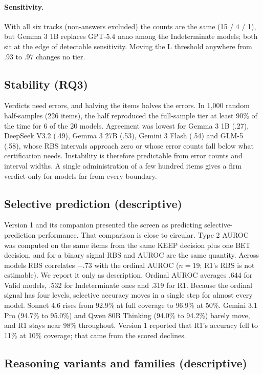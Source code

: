 \documentclass[11pt,a4paper]{article}
\begin{document}
\paragraph{Sensitivity.} With all six tracks (non-answers excluded) the counts are the same (15 / 4 / 1), but Gemma 3 1B replaces GPT-5.4 nano among the Indeterminate models; both sit at the edge of detectable sensitivity. Moving the L threshold anywhere from .93 to .97 changes no tier.

\subsection{Stability (RQ3)}

Verdicts need errors, and halving the items halves the errors. In 1,000 random half-samples (226 items), the half reproduced the full-sample tier at least 90\% of the time for 6 of the 20 models. Agreement was lowest for Gemma 3 1B (.27), DeepSeek V3.2 (.49), Gemma 3 27B (.53), Gemini 3 Flash (.54) and GLM-5 (.58), whose RBS intervals approach zero or whose error counts fall below what certification needs. Instability is therefore predictable from error counts and interval widths. A single administration of a few hundred items gives a firm verdict only for models far from every boundary.

\subsection{Selective prediction (descriptive)}

Version 1 and its companion presented the screen as predicting selective-prediction performance. That comparison is close to circular. Type 2 AUROC was computed on the same items from the same KEEP decision plus one BET decision, and for a binary signal RBS and AUROC are the same quantity. Across models RBS correlates $-.73$ with the ordinal AUROC ($n = 19$; R1's RBS is not estimable). We report it only as description. Ordinal AUROC averages .644 for Valid models, .532 for Indeterminate ones and .319 for R1. Because the ordinal signal has four levels, selective accuracy moves in a single step for almost every model. Sonnet 4.6 rises from 92.9\% at full coverage to 96.9\% at 50\%. Gemini 3.1 Pro (94.7\% to 95.0\%) and Qwen 80B Thinking (94.0\% to 94.2\%) barely move, and R1 stays near 98\% throughout. Version 1 reported that R1's accuracy fell to 11\% at 10\% coverage; that came from the scored declines.

\subsection{Reasoning variants and families (descriptive)}
\end{document}
